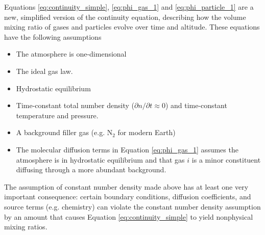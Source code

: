 Equations \eqref{eq:continuity_simple}, \eqref{eq:phi_gas_1} and \eqref{eq:phi_particle_1} are a new, simplified version of the continuity equation, describing how the volume mixing ratio of gases and particles evolve over time and altitude. These equations have the following assumptions
\begin{itemize}
  \item The atmosphere is one-dimensional
  \item The ideal gas law.
  \item Hydrostatic equilibrium
  \item Time-constant total number density ($\partial n / \partial t \approx 0$) and time-constant temperature and pressure.
  \item A background filler gas (e.g. N$_2$ for modern Earth)
  \item The molecular diffusion terms in Equation \eqref{eq:phi_gas_1} assumes the atmosphere is in hydrostatic equilibrium and that gas $i$ is a minor constituent diffusing through a more abundant background.
\end{itemize}



The assumption of constant number density made above has at least one very important consequence: certain boundary conditions, diffusion coefficients, and source terms (e.g. chemistry) can violate the constant number density assumption by an amount that causes Equation \eqref{eq:continuity_simple} to yield nonphysical mixing ratios.

